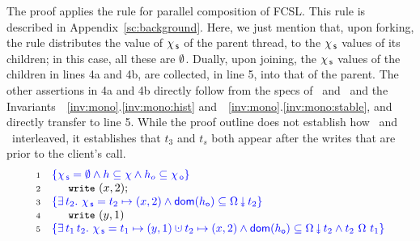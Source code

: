 The proof applies the rule for parallel composition of FCSL. This rule
is described in Appendix~\ref{sc:background}.
%
Here, we just mention that, upon forking, the rule distributes the
value of $\chi_{\, \mathsf{s}}$ of the parent thread, to the $\chi_{\, \mathsf{s}}$ values of its
children; in this case, all these are $\emptyset$. Dually, upon joining,
the $\chi_{\, \mathsf{s}}$ values of the children in lines 4a and 4b, are collected,
in line 5, into that of the parent. The other assertions in 4a and 4b
directly follow from the specs of \jyscan\ and \jywrite\ and the
Invariants~~\ref{inv:mono}.\ref{inv:mono:hist}
and~~\ref{inv:mono}.\ref{inv:mono:stable}, and directly transfer to
line 5.
%
While the proof outline does not establish how
\jyscan\ and \jywrite\ interleaved, it establishes that $t_3$ and $t_s$
both appear after the writes that are prior to the client's call.
{
\[
\begin{array}{r l}
  \num{1} & \specK{\{ \histS = \hempty \wedge h \subseteq \hist \wedge
    h_o \subseteq \histO \}} \\ %
  \num{2} & \esc{write}~(x,2);\\
  \num{3} & \specK{\{ \exists\, t_2 \ldot\, \histS = t_2 \hpts (x,2) \wedge \dom{h_{\othersub}} \subseteq \sideal{\stableorder}{t_2} \}} \\
  \num{4} & \esc{write}~(y,1)\\
  \num{5} & \specK{\{ \exists\, t_1\, t_2\ldot\, 
    \histS = t_1 \hpts (y,1) \hunion t_2 \hpts (x,2) \wedge %
    \dom{h_{\othersub}} \subseteq \sideal{\stableorder}{t_2} \wedge 
    t_2\ {\stableorder}\ t_1\}}
\end{array}
\]}

